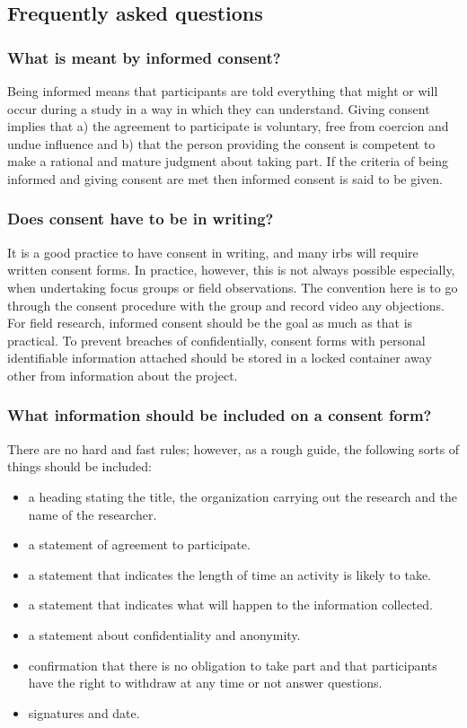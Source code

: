 \subsection{Frequently asked questions}

\subsubsection{What is meant by informed consent?}

Being informed means that participants are told everything that might or will occur during a study in a way in which they can understand. Giving consent implies that a) the agreement to participate is voluntary, free from coercion and undue influence and b) that the person providing the consent is competent to make a rational and mature judgment about taking part. If the criteria of being informed and giving consent are met then informed consent is said to be given.

\subsubsection{Does consent have to be in writing?}

It is a good practice to have consent in writing, and many \glspl{irb} will require written consent forms. In practice, however, this is not always possible especially, when undertaking focus groups or field observations. The convention here is to go through the consent procedure with the group and record video any objections. For field research, informed consent should be the goal as much as that is practical. To prevent breaches of confidentially, consent forms with personal identifiable information attached should be stored in a locked container away other from information about the project.

\subsubsection{What information should be included on a consent form?}

There are no hard and fast rules; however, as a rough guide, the following sorts of things should be included:

\begin{itemize}
	\item a heading stating the title, the organization carrying out the research and the name of the researcher.
	\item a statement of agreement to participate.
	\item a statement that indicates the length of time an activity is likely to take.
	\item a statement that indicates what will happen to the information collected.
	\item a statement about confidentiality and anonymity.
	\item confirmation that there is no obligation to take part and that participants have the right to withdraw at any time or not answer questions.
	\item signatures and date.
\end{itemize}

